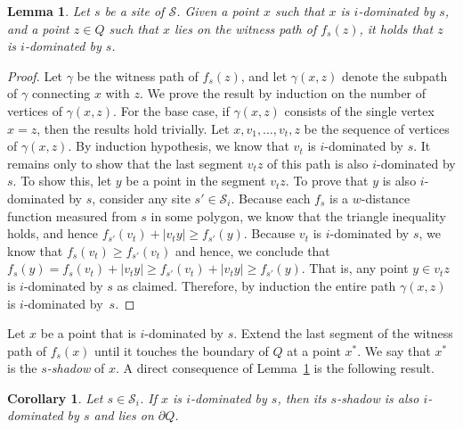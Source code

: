 \documentclass[a4paper, 11pt]{article}
\newtheorem{corollary}[theorem]{Corollary}
\newtheorem{lemma}[theorem]{Lemma}
\newcommand{\icell}[1][i]{${#1}$-patch\xspace}
\newcommand{\idom}[1][i]{${#1}$-dominated\xspace}
\newcommand{\s}{\mathcal S}
\begin{document}
\begin{lemma}\label{lemma:Shadow points}
Let $s$ be a site of $\s$.
Given a point $x$ such that $x$ is \idom by $s$, and a point $z\in Q$ such that $x$ lies on the witness path of $f_s(z)$,
it holds that $z$ is \idom by $s$. 
\end{lemma}
\begin{proof}
Let $\gamma$ be the witness path of $f_s(z)$, and let $\gamma(x, z)$ denote the subpath of $\gamma$ connecting $x$ with $z$.
We prove the result by induction on the number of vertices of $\gamma(x, z)$.
For the base case, if $\gamma(x, z)$ consists of the single vertex $x = z$, then the results hold trivially. 
Let $x , v_1, \ldots, v_t,  z$ be the sequence of vertices of $\gamma(x, z)$. 
By induction hypothesis, we know that $v_t$ is \idom by $s$.
It remains only to show that the last segment $v_t z$ of this path is also \idom by $s$.
To show this, let $y$ be a point in the segment $v_t z$.
To prove that $y$  is also \idom by $s$, consider any site $s'\in \s_i$. 
Because each $f_s$ is a $w$-distance function measured from $s$ in some polygon, we know that the triangle inequality holds, and hence $f_{s'}(v_t) + |v_t y| \geq f_{s'}(y)$.
Because $v_t$ is \idom by $s$, we know that $f_s(v_t) \geq f_{s'}(v_t)$ and hence, we conclude that 
$f_s(y) = f_s(v_t) + |v_t y| \geq f_{s'}(v_t) + |v_t y| \geq f_{s'}(y)$.
That is, any point $y\in v_t z$ is \idom by $s$ as claimed.
Therefore, by induction the entire path $\gamma(x, z)$ is \idom by~$s$.
\end{proof}

Let $x$ be a point that is \idom by $s$. Extend the last segment of the witness path of $f_s(x)$ until it touches the boundary of $Q$ at a point $x^*$.
We say that $x^*$ is the \emph{$s$-shadow} of $x$. A direct consequence of Lemma~\ref{lemma:Shadow points} is the following result.

\begin{corollary}\label{corollary: Shadows in cell as well}
Let $s \in \s_i$.
If $x$ is \idom by $s$, then its $s$-shadow is also \idom by $s$ and lies on $\partial Q$.
\end{corollary}


\end{document}
